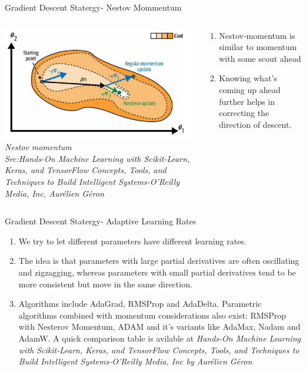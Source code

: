 \begin{frame}{Gradient Descent Statergy- Nestov Mommentum}
	\begin{columns}[T]
        \begin{column}{0.4\textwidth}
        	\includegraphics[width=\textwidth]{images/nestov.png}
        	\tiny{\textit{Nestov momentum\\ Src:Hands-On Machine Learning with Scikit-Learn, Keras, and TensorFlow  Concepts, Tools, and Techniques to Build Intelligent Systems-O'Reilly Media, Inc, Aurélien Géron}}
        \end{column}
	    \begin{column}{0.6\textwidth}
    	    \begin{enumerate}[$\bullet$]
        		\item Nestov-momentum is similar to momentum with some scout ahead\pause
        		\item Knowing what's coming up ahead further helps in correcting the direction of descent.
        	\end{enumerate}
    	\end{column}
    \end{columns}
\end{frame}

\begin{frame}{Gradient Descent Statergy- Adaptive Learning Rates}
    \begin{enumerate}[$\bullet$]
		\item We try to let different parameters have different learning rates.\pause
		\item The idea is that parameters with large partial derivatives are often oscillating and
		zigzagging, whereas parameters with small partial derivatives tend to be more consistent
		but move in the same direction.\pause
		\item  Algorithms include AdaGrad, RMSProp and AdaDelta. Parametric algorithms combined with momentum considerations also exist: RMSProp with Nesterov Momentum, ADAM and it's variants like AdaMax, Nadam and AdamW. A quick comparison table is avilable at \textit{Hands-On Machine Learning with Scikit-Learn, Keras, and TensorFlow  Concepts, Tools, and Techniques to Build Intelligent Systems-O'Reilly Media, Inc by Aurélien Géron}
    \end{enumerate}
\end{frame}




